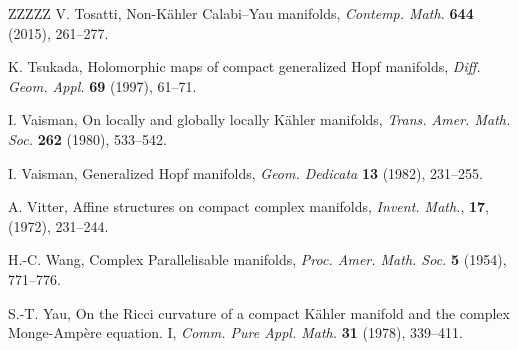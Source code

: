 \documentclass[12pt,reqno]{amsart}
\theoremstyle{definition}
\numberwithin{equation}{section}
\begin{document}
\begin{thebibliography}{ZZZZZ}
 V. Tosatti, Non-K\"ahler Calabi--Yau manifolds, \textit{Contemp. Math.} \textbf{644} 
(2015), 261--277.

 K. Tsukada, Holomorphic maps of compact generalized Hopf manifolds, {\it Diff. Geom. 
Appl.} {\bf 69} (1997), 61--71.

 I. Vaisman, On locally and globally locally K\"ahler manifolds, {\it Trans. Amer. Math. 
Soc.} {\bf 262} (1980), 533--542.

 I. Vaisman, Generalized Hopf manifolds, {\it Geom. Dedicata} {\bf 13} (1982), 231--255.

 A. Vitter, Affine structures on compact complex manifolds, {\it Invent. Math.}, {\bf 17}, (1972), 231--244.

 H.-C. Wang, Complex Parallelisable manifolds, \textit{Proc. Amer. Math. Soc.} \textbf{5} 
(1954), 771--776.

 S.-T. Yau, On the Ricci curvature of a compact K\"ahler manifold and the complex 
Monge-Amp\`ere equation. I, {\it Comm. Pure Appl. Math.} {\bf 31} (1978), 339--411.

\end{thebibliography}
\end{document}
